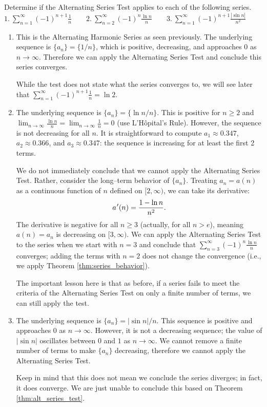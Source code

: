 \documentclass[10pt]{article}
\newcommand{\ds}{\displaystyle}
\newcommand{\primeskip}{\hskip.75pt}
\begin{document}
{
Determine if the Alternating Series Test applies to each of the following series.\\

\noindent$\ds 1.\ \sum_{n=1}^\infty (-1)^{n+1}\frac1n\qquad 2.\ \sum_{n=2}^\infty (-1)^n\frac{\ln n}{n}\qquad 3.\ \sum_{n=1}^\infty (-1)^{n+1}\frac{|\sin n|}{n^2}$
}
{\begin{enumerate}
	\item This is the Alternating Harmonic Series as seen previously. The underlying sequence is $\{a_n\} = \{1/n\}$, which is positive, decreasing, and approaches 0 as $n\to\infty$. Therefore we can apply the Alternating Series Test and conclude this series converges. 
	
	While the test does not state what the series converges to, we will see later that $\ds \sum_{n=1}^\infty (-1)^{n+1}\frac1n=\ln2.$
	
	\item		The underlying sequence is $\{a_n\} = \{\ln n/n\}$. This is positive for $n\geq 2$ and $\ds \lim_{n\to \infty} \frac{\ln n}{n}=\lim_{n\to \infty}\frac{1}{n}=0$ (use L'H\^opital's Rule). However, the sequence is not decreasing for all $n$. It is straightforward to compute $a_1\approx0.347$, $a_2\approx 0.366$, and $a_3\approx 0.347$: the sequence is increasing for at least the first 2 terms. 
	
	We do not immediately conclude that we cannot apply the Alternating Series Test. Rather, consider the long--term behavior of $\{a_n\}$. Treating $a_n=a(n)$ as a continuous function of $n$ defined on $[2,\infty)$, we can take its derivative:
	$$a\primeskip  '(n) = \frac{1-\ln n}{n^2}.$$
	The derivative is negative for all $n\geq 3$ (actually, for all $n>e$), meaning $a(n)=a_n$ is decreasing on $[3,\infty)$. We can apply the Alternating Series Test to the series when we start with $n=3$ and conclude that $\ds \sum_{n=3}^\infty(-1)^n\frac{\ln n}{n}$ converges; adding the terms with $n=2$ does not change the convergence (i.e., we apply Theorem \ref{thm:series_behavior}).
	
	The important lesson here is that as before, if a series fails to meet the criteria of the Alternating Series Test on only a finite number of terms, we can still apply the test.
	
	\item  The underlying sequence is $\{a_n\} = |\sin n|/n$. This sequence is positive and approaches $0$ as $n\to\infty$. However, it is not a decreasing sequence; the value of $|\sin n|$ oscillates between $0$ and $1$ as $n\to\infty$. We cannot remove a finite number of terms to make $\{a_n\}$ decreasing, therefore we cannot apply the Alternating Series Test.
	
	Keep in mind that this does not mean we conclude the series diverges; in fact, it does converge. We are just unable to conclude this based on Theorem \ref{thm:alt_series_test}.
\end{enumerate}
}
\end{document}
